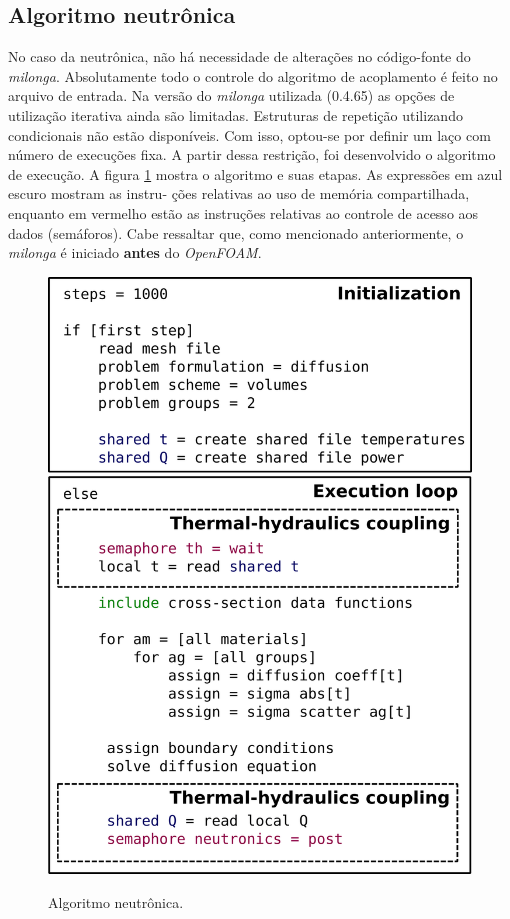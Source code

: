 \subsection{Algoritmo neutrônica}

No caso da neutrônica, não há necessidade de alterações no código-fonte do \textit{milonga}. Absolutamente
todo o controle do algoritmo de acoplamento é feito no arquivo de entrada. Na versão do
\textit{milonga} utilizada (0.4.65) as opções de utilização iterativa ainda são limitadas. Estruturas
de repetição utilizando condicionais não estão disponíveis. Com isso, optou-se por definir um laço com número
de execuções fixa. A partir dessa restrição, foi desenvolvido o algoritmo de execução. A figura
\ref{fig:algo_neutronica} mostra o algoritmo e suas etapas. As expressões em azul escuro mostram as instru-
ções relativas ao uso de memória compartilhada, enquanto em vermelho estão
as instruções relativas ao controle de acesso aos dados (semáforos). Cabe ressaltar que,
como mencionado anteriormente,
o \textit{milonga} é iniciado \textbf{antes} do \textit{OpenFOAM}.

\begin{figure}[htb]
  \caption{Algoritmo neutrônica.}
  \centering\includegraphics[scale=0.5]{figuras/algoritmos_milonga.png}
  \label{fig:algo_neutronica}
\end{figure}

